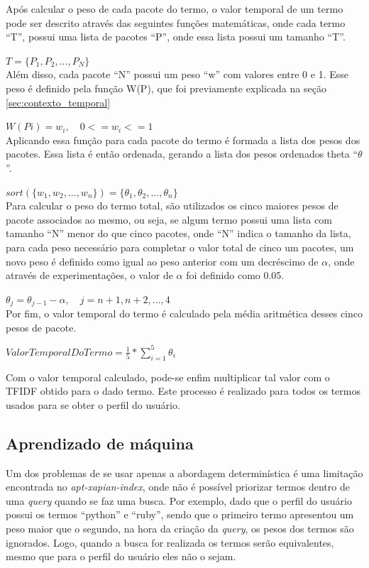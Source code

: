 Após calcular o peso de cada pacote do termo, o valor temporal de um termo pode ser
descrito através das seguintes funções matemáticas, onde cada termo ``T'', possui uma
lista de pacotes ``P'', onde essa lista possui um tamanho ``T''.

$T = \{P_1, P_2, ..., P_N\}$
\\

Além disso, cada pacote ``N'' possui um peso ``w'' com valores entre 0 e 1. Esse peso
é definido pela função W(P), que foi previamente explicada na seção
\ref{sec:contexto_temporal}

$W(Pi) = w_i , \quad 0 <= w_i <= 1$
\\

Aplicando essa função para cada pacote do termo é formada a lista dos pesos
dos pacotes. Essa lista é então ordenada, gerando a lista
dos pesos ordenados theta ``$\theta$''.

$sort(\{w_1, w_2, ..., w_n\}) = \{\theta_1, \theta_2, ..., \theta_n\}$
\\

Para calcular o peso do termo total, são utilizados os cinco maiores pesos de pacote
associados ao mesmo, ou seja, se algum termo possui uma lista com tamanho ``N''
menor do que cinco pacotes, onde ``N'' indica o tamanho da lista, para cada peso
necessário para completar o valor total de cinco um pacotes, um novo peso
é definido como igual ao peso anterior com um decréscimo de $\alpha$, onde
através de experimentações, o valor de $\alpha$ foi definido como 0.05.

$\theta_j = \theta_{j-1} - \alpha , \quad j = n+1, n+2, ..., 4$
\\

Por fim, o valor temporal do termo é calculado pela média aritmética desses
cinco pesos de pacote.

$ValorTemporalDoTermo = \frac{1}{5} * \sum\limits_{i=1}^{5} \theta_i$

Com o valor temporal calculado, pode-se enfim multiplicar tal valor com o TFIDF
obtido para o dado termo. Este processo é realizado para todos os termos usados
para se obter o perfil do usuário.

\subsection{Aprendizado de máquina}

Um dos problemas de se usar apenas a abordagem determinística é uma limitação
encontrada no \textit{apt-xapian-index}, onde não é possível priorizar termos
dentro de uma \textit{query} quando se faz uma busca. Por exemplo, dado que o perfil
do usuário possui os termos ``python'' e ``ruby'', sendo que o primeiro termo
apresentou um peso maior que o segundo, na hora da criação da \textit{query}, os pesos
dos termos são ignorados. Logo, quando a busca for realizada os termos serão
equivalentes, mesmo que para o perfil do usuário eles não o sejam.

